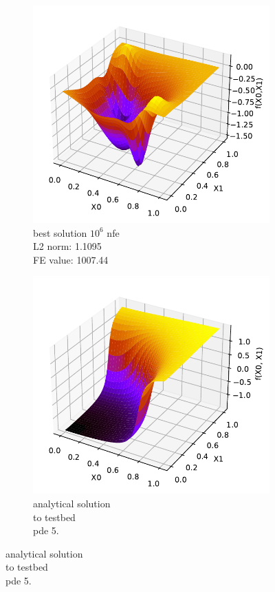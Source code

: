 \documentclass[./\jobname.tex]{subfiles}
\begin{document}
\begin{figure}[h]
\begin{subfigure}[b]{0.3333\linewidth}
		\includegraphics[width=1\textwidth]{../../code/experiments/experiment_0/pde5_best_sol_10_6.pdf}
		\caption{best solution $10^6$ \gls{nfe} \\ L2 norm: 1.1095 \\ FE value: 1007.44}
		\label{fig:pde5_sol_10_6}
	\end{subfigure}%
	\begin{subfigure}[b]{0.3333\linewidth}
		\centering
		\includegraphics[width=1\textwidth]{../../code/testbed/pde5/sol_pde_5.pdf}
		\caption{analytical solution \\to testbed \\ \gls{pde} 5.}
		\label{fig:pde5_analytical_solution}
	\end{subfigure}%
	\label{fig:serial_jade_pde5_sol_comparison}
\end{figure}
\end{document}

